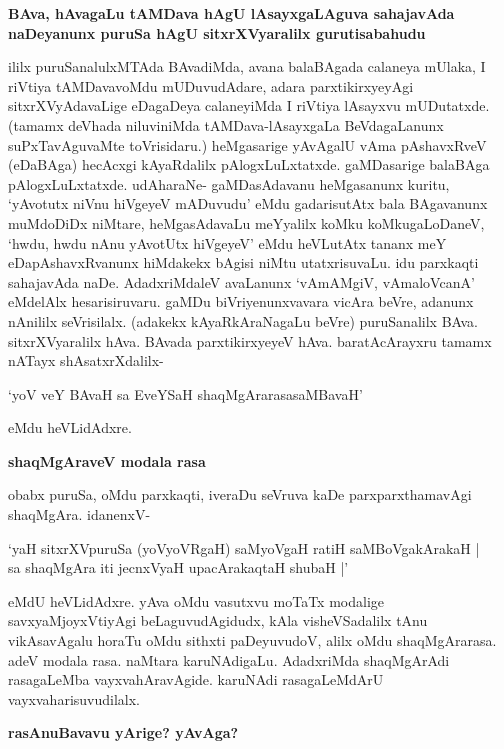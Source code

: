 \noindent
{\bf\large{BAva, hAvagaLu tAMDava hAgU lAsayxgaLAguva sahajavAda naDeyanunx puruSa hAgU sitxrXVyaralilx gurutisabahudu}}\label{page226}

ililx puruSanalulxMTAda BAvadiMda, avana balaBAgada calaneya mUlaka, I riVtiya tAMDavavoMdu mUDuvudAdare, adara parxtikirxyeyAgi sitxrXVyAdavaLige eDagaDeya calaneyiMda I riVtiya lAsayxvu mUDutatxde. (tamamx deVhada niluviniMda tAMDava-lAsayxgaLa BeVdagaLanunx suPxTavAguvaMte toVrisidaru.) heMgasarige yAvAgalU vAma pAshavxRveV (eDaBAga) hecAcxgi kAyaRdalilx pAlogxLuLxtatxde. gaMDasarige balaBAga pAlogxLuLxtatxde. udAharaNe- gaMDasAdavanu heMgasanunx kuritu, `yAvotutx niVnu hiVgeyeV mADuvudu' eMdu gadarisutAtx bala BAgavanunx muMdoDiDx niMtare, heMgasAdavaLu meYyalilx koMku koMkugaLoDaneV, `hwdu, hwdu nAnu yAvotUtx hiVgeyeV' eMdu heVLutAtx tananx meY eDapAshavxRvanunx hiMdakekx bAgisi niMtu utatxrisuvaLu. idu parxkaqti sahajavAda naDe. AdadxriMdaleV avaLanunx `vAmAMgiV, vAmaloVcanA' eMdelAlx hesarisiruvaru. gaMDu biVriyenunxvavara vicAra beVre, adanunx nAnililx seVrisilalx. (adakekx kAyaRkAraNagaLu beVre) puruSanalilx BAva. sitxrXVyaralilx hAva. BAvada parxtikirxyeyeV hAva. baratAcArayxru tamamx nATayx shAsatxrXdalilx-

\begin{shloka} 
`yoV veY BAvaH sa EveYSaH shaqMgArarasasaMBavaH'\label{227}
\end{shloka}

eMdu heVLidAdxre.

\noindent
{\bf\large{shaqMgAraveV modala rasa}}\label{page227}

obabx puruSa, oMdu parxkaqti, iveraDu seVruva kaDe parxparxthamavAgi shaqMgAra. idanenxV-

\begin{shloka}
`yaH sitxrXVpuruSa (yoVyoVRgaH) saMyoVgaH ratiH saMBoVgakArakaH |\\\label{227}
sa shaqMgAra iti jecnxVyaH upacArakaqtaH shubaH |'
\end{shloka}

eMdU heVLidAdxre. yAva oMdu vasutxvu moTaTx modalige savxyaMjoyxVtiyAgi beLaguvudAgidudx, kAla visheVSadalilx tAnu vikAsavAgalu horaTu oMdu sithxti paDeyuvudoV, alilx oMdu shaqMgArarasa. adeV modala rasa. naMtara karuNAdigaLu. AdadxriMda shaqMgArAdi rasagaLeMba vayxvahAravAgide. karuNAdi rasagaLeMdArU vayxvaharisuvudilalx.

\noindent
{\bf\large{rasAnuBavavu yArige? yAvAga?}}\label{page227}

